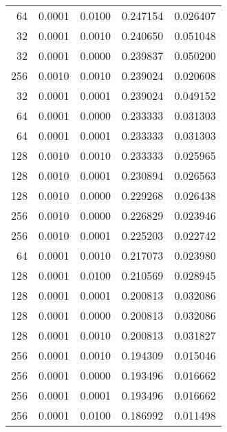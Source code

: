 \begin{tabular}{rrrrr}
  64 &  0.0001 &  0.0100 &  0.247154 &  0.026407 \\
  32 &  0.0001 &  0.0010 &  0.240650 &  0.051048 \\
  32 &  0.0001 &  0.0000 &  0.239837 &  0.050200 \\
 256 &  0.0010 &  0.0010 &  0.239024 &  0.020608 \\
  32 &  0.0001 &  0.0001 &  0.239024 &  0.049152 \\
  64 &  0.0001 &  0.0000 &  0.233333 &  0.031303 \\
  64 &  0.0001 &  0.0001 &  0.233333 &  0.031303 \\
 128 &  0.0010 &  0.0010 &  0.233333 &  0.025965 \\
 128 &  0.0010 &  0.0001 &  0.230894 &  0.026563 \\
 128 &  0.0010 &  0.0000 &  0.229268 &  0.026438 \\
 256 &  0.0010 &  0.0000 &  0.226829 &  0.023946 \\
 256 &  0.0010 &  0.0001 &  0.225203 &  0.022742 \\
  64 &  0.0001 &  0.0010 &  0.217073 &  0.023980 \\
 128 &  0.0001 &  0.0100 &  0.210569 &  0.028945 \\
 128 &  0.0001 &  0.0001 &  0.200813 &  0.032086 \\
 128 &  0.0001 &  0.0000 &  0.200813 &  0.032086 \\
 128 &  0.0001 &  0.0010 &  0.200813 &  0.031827 \\
 256 &  0.0001 &  0.0010 &  0.194309 &  0.015046 \\
 256 &  0.0001 &  0.0000 &  0.193496 &  0.016662 \\
 256 &  0.0001 &  0.0001 &  0.193496 &  0.016662 \\
 256 &  0.0001 &  0.0100 &  0.186992 &  0.011498 \\
\bottomrule
\end{tabular}
